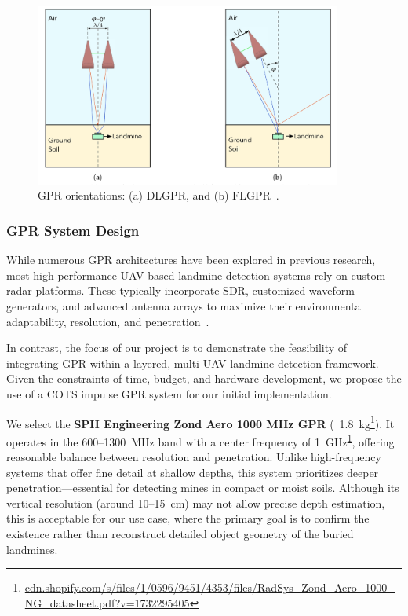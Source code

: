 \begin{figure}[H]
    \centering
    \includegraphics[height=6cm]{figs/Huirui/gpr_ori_modes.png}
    \caption[GPR orientations]{GPR orientations: (a) DLGPR, and (b) FLGPR~\cite{vsipovs2020lightweight}.}
    \label{fig:GPR_Ori_modes}
\end{figure}



\subsubsection{GPR System Design}\label{GPR_design}

While numerous \gls{GPR} architectures have been explored in previous research, most high-performance \gls{UAV}-based landmine detection systems rely on custom radar platforms. These typically incorporate \gls{SDR}, customized waveform generators, and advanced antenna arrays to maximize their environmental adaptability, resolution, and penetration~\cite{cerquera2017uav}.

In contrast, the focus of our project is to demonstrate the feasibility of integrating \gls{GPR} within a layered, multi-\gls{UAV} landmine detection framework. Given the constraints of time, budget, and hardware development, we propose the use of a \gls{COTS} impulse \gls{GPR} system for our initial implementation.

We select the \textbf{SPH Engineering Zond Aero 1000 MHz \gls{GPR}} (~1.8~kg\footnote{\label{Zond}\url{cdn.shopify.com/s/files/1/0596/9451/4353/files/RadSys_Zond_Aero_1000_NG_datasheet.pdf?v=1732295405}}). It operates in the 600–1300~MHz band with a center frequency of 1~GHz\textsuperscript{\ref{Zond}}, offering reasonable balance between resolution and penetration. Unlike high-frequency systems that offer fine detail at shallow depths, this system prioritizes deeper penetration—essential for detecting mines in compact or moist soils. Although its vertical resolution (around 10--15~cm) may not allow precise depth estimation, this is acceptable for our use case, where the primary goal is to confirm the existence rather than reconstruct detailed object geometry of the buried landmines.


